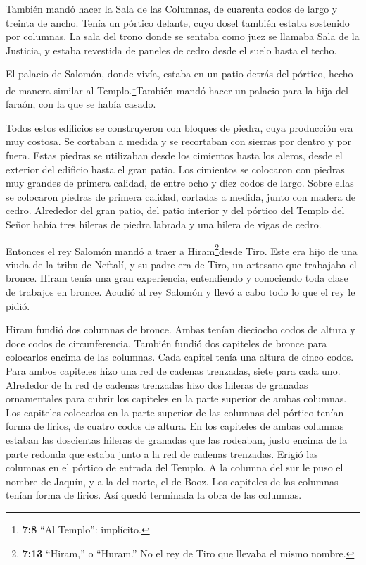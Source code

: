  También mandó hacer la Sala de las Columnas, de cuarenta
codos de largo y treinta de ancho. Tenía un pórtico delante, cuyo dosel
también estaba sostenido por columnas.  La sala del trono
donde se sentaba como juez se llamaba Sala de la Justicia, y estaba
revestida de paneles de cedro desde el suelo hasta el techo.

 El palacio de Salomón, donde vivía, estaba en un patio
detrás del pórtico, hecho de manera similar al Templo.\footnote{\textbf{7:8}
  ``Al Templo'': implícito.}También mandó hacer un palacio para la hija
del faraón, con la que se había casado.

 Todos estos edificios se construyeron con bloques de
piedra, cuya producción era muy costosa. Se cortaban a medida y se
recortaban con sierras por dentro y por fuera. Estas piedras se
utilizaban desde los cimientos hasta los aleros, desde el exterior del
edificio hasta el gran patio.  Los cimientos se colocaron
con piedras muy grandes de primera calidad, de entre ocho y diez codos
de largo.  Sobre ellas se colocaron piedras de primera
calidad, cortadas a medida, junto con madera de cedro. 
Alrededor del gran patio, del patio interior y del pórtico del Templo
del Señor había tres hileras de piedra labrada y una hilera de vigas de
cedro.

 Entonces el rey Salomón mandó a traer a
Hiram\footnote{\textbf{7:13} ``Hiram,'' o ``Huram.'' No el rey de Tiro
  que llevaba el mismo nombre.}desde Tiro.  Este era hijo
de una viuda de la tribu de Neftalí, y su padre era de Tiro, un artesano
que trabajaba el bronce. Hiram tenía una gran experiencia, entendiendo y
conociendo toda clase de trabajos en bronce. Acudió al rey Salomón y
llevó a cabo todo lo que el rey le pidió.

 Hiram fundió dos columnas de bronce. Ambas tenían
dieciocho codos de altura y doce codos de circunferencia. 
También fundió dos capiteles de bronce para colocarlos encima de las
columnas. Cada capitel tenía una altura de cinco codos. 
Para ambos capiteles hizo una red de cadenas trenzadas, siete para cada
uno.  Alrededor de la red de cadenas trenzadas hizo dos
hileras de granadas ornamentales para cubrir los capiteles en la parte
superior de ambas columnas.  Los capiteles colocados en la
parte superior de las columnas del pórtico tenían forma de lirios, de
cuatro codos de altura.  En los capiteles de ambas columnas
estaban las doscientas hileras de granadas que las rodeaban, justo
encima de la parte redonda que estaba junto a la red de cadenas
trenzadas.  Erigió las columnas en el pórtico de entrada
del Templo. A la columna del sur le puso el nombre de Jaquín, y a la del
norte, el de Booz.  Los capiteles de las columnas tenían
forma de lirios. Así quedó terminada la obra de las columnas.

